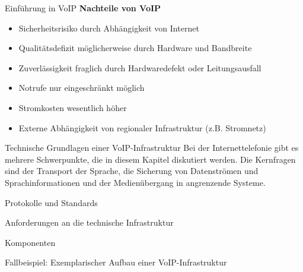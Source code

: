 \begin{section}{Einführung in VoIP}
 	\textbf{Nachteile von VoIP}
 	\begin{itemize}
 		\item Sicherheitsrisiko durch Abhängigkeit von Internet
 		\item Qualitätsdefizit möglicherweise durch Hardware und Bandbreite
 		\item Zuverlässigkeit fraglich durch Hardwaredefekt oder Leitungsausfall
 		\item Notrufe nur eingeschränkt möglich
 		\item Stromkosten wesentlich höher
 		\item Externe Abhängigkeit von regionaler Infrastruktur (z.B. Stromnetz)
 	\end{itemize}
 	 	
 \end{section}
 
 \label{Technische Grundlagen einer VoIP-Infrastruktur}
 \begin{section}{Technische Grundlagen einer VoIP-Infrastruktur}
	Bei der Internettelefonie gibt es mehrere Schwerpunkte, die in diesem Kapitel 
	diskutiert werden.
	Die Kernfragen sind der Transport der Sprache, die Sicherung von Datenströmen 
	und Sprachinformationen und der Medienübergang in angrenzende Systeme.
 	\label{Protokolle und Standards}
 	\begin{subsection}{Protokolle und Standards}
 	\end{subsection}
 
 	\label{Anforderungen an die technische Infrastruktur}
 	\begin{subsection}{Anforderungen an die technische Infrastruktur}
 	\end{subsection}
 
	 \label{Komponenten}
 	\begin{subsection}{Komponenten}
 	\end{subsection}
 
 \end{section}
 
 \label{Fallbeispiel: Exemplarischer Aufbau einer VoIP-Infrastruktur}
 \begin{section}{Fallbeispiel: Exemplarischer Aufbau einer VoIP-Infrastruktur}
 \end{section}
 
